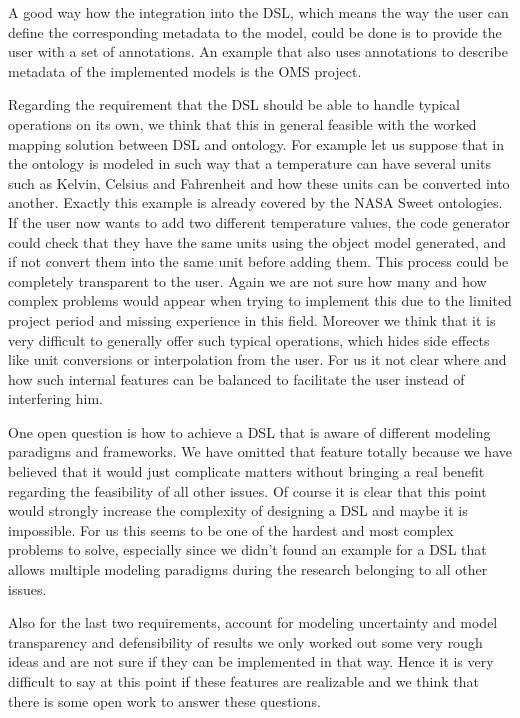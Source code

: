 A good way how the integration into the DSL, which means the way the user can define the corresponding metadata to the model, could be done is to provide the user with a set of annotations. An example that also uses annotations to describe metadata of the implemented models is the OMS project.
\par
Regarding the requirement that the DSL should be able to handle typical operations on its own, we think that this in general feasible with the worked mapping solution between DSL and ontology. For example let us suppose that in the ontology is modeled in such way that a temperature can have several units such as Kelvin, Celsius and Fahrenheit and how these units can be converted into another. Exactly this example is already covered by the NASA Sweet ontologies. If the user now wants to add two different temperature values, the code generator could check that they have the same units using the object model generated, and if not convert them into the same unit before adding them. This process could be completely transparent to the user. Again we are not sure how many and how complex problems would appear when trying to implement this due to the limited project period and missing experience in this field. Moreover we think that it is very difficult to generally offer such typical operations, which hides side effects like unit conversions or interpolation from the user. For us it not clear where and how such internal features can be balanced to facilitate the user instead of interfering him.
\par
One open question is how to achieve a DSL that is aware of different modeling paradigms and frameworks. We have omitted that feature totally because we have believed that it would just complicate matters without bringing a real benefit regarding the feasibility of all other issues. Of course it is clear that this point would strongly increase the complexity of designing a DSL and maybe it is impossible. For us this seems to be one of the hardest and most complex problems to solve, especially since we didn’t found an example for a DSL that allows multiple modeling paradigms during the research belonging to all other issues.
\par
Also for the last two requirements, account for modeling uncertainty and model transparency and defensibility of results we only worked out some very rough ideas and are not sure if they can be implemented in that way. Hence it is very difficult to say at this point if these features are realizable and we think that there is some open work to answer these questions.

